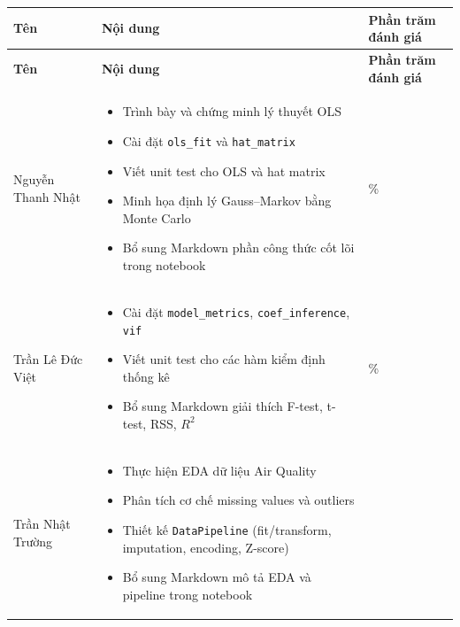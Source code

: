 \documentclass[a4paper]{article}
\begin{document}
\begingroup
\small
\setlength{\tabcolsep}{4pt}
\renewcommand{\arraystretch}{1.15}
\begin{longtable}{|>{\raggedright\arraybackslash}p{}|>{\raggedright\arraybackslash}p{}|>{\centering\arraybackslash}p{}|}

\hline
\textbf{Tên} & \textbf{Nội dung} & \textbf{Phần trăm đánh giá} \\ \hline
\endfirsthead
\hline
\textbf{Tên} & \textbf{Nội dung} & \textbf{Phần trăm đánh giá} \\ \hline
\endhead
Nguyễn Thanh Nhật   & \begin{itemize}[leftmargin=*, noitemsep, topsep=0pt, partopsep=0pt]
                        \item Trình bày và chứng minh lý thuyết OLS
                        \item Cài đặt \texttt{ols\_fit} và \texttt{hat\_matrix}
                        \item Viết unit test cho OLS và hat matrix
                        \item Minh họa định lý Gauss--Markov bằng Monte Carlo
                        \item Bổ sung Markdown phần công thức cốt lõi trong notebook
                    \end{itemize} & 100\% \\ \hline
Trần Lê Đức Việt   & \begin{itemize}[leftmargin=*, noitemsep, topsep=0pt, partopsep=0pt]
                        \item Cài đặt \texttt{model\_metrics}, \texttt{coef\_inference}, \texttt{vif}
                        \item Viết unit test cho các hàm kiểm định thống kê
                        \item Bổ sung Markdown giải thích F-test, t-test, RSS, $R^2$
                    \end{itemize} & 100\% \\ \hline
Trần Nhật Trường & \begin{itemize}[leftmargin=*, noitemsep, topsep=0pt, partopsep=0pt]
                        \item Thực hiện EDA dữ liệu Air Quality
                        \item Phân tích cơ chế missing values và outliers
                        \item Thiết kế \texttt{DataPipeline} (fit/transform, imputation, encoding, Z-score)
                        \item Bổ sung Markdown mô tả EDA và pipeline trong notebook

\end{itemize}
\end{longtable}
\end{document}
